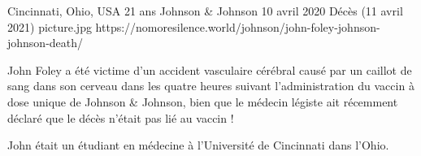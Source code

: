 {Cincinnati, Ohio, USA}
{21 ans}
{Johnson \& Johnson }
{10 avril 2020}
{Décès (11 avril 2021)}
{picture.jpg}
{https://nomoresilence.world/johnson/john-foley-johnson-johnson-death/}
{

John Foley a été victime d'un accident vasculaire cérébral causé par un caillot
de sang dans son cerveau dans les quatre heures suivant l'administration du
vaccin à dose unique de Johnson \& Johnson, bien que le médecin légiste ait
récemment déclaré que le décès n'était pas lié au vaccin !

John était un étudiant en médecine à l'Université de Cincinnati dans l'Ohio.

}
